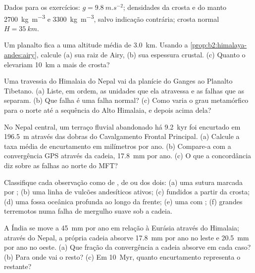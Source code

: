 Dados para os exercícios: $g = \qty{9.8}{m.s^{-2}}$; densidades da crosta e do manto
\qty{2700}{kg.m^{-3}} e \qty{3300}{kg.m^{-3}}, salvo indicação contrária; crosta normal $H =
\qty{35}{km}$.

\begin{exercise}[$\star$]\label{exo:b2:himalaya-andes:1}
Um planalto fica a uma altitude média de \qty{3.0}{km}. Usando a
\cref{prop:b2:himalaya-andes:airy}, calcule (a) sua raiz de Airy, (b) sua espessura crustal.
(c) Quanto o elevariam \qty{10}{km} a mais de crosta?
\end{exercise}

\begin{exercise}[$\star$]\label{exo:b2:himalaya-andes:2}
Uma travessia do Himalaia do Nepal vai da planície do Ganges ao Planalto Tibetano.
(a) Liste, em ordem, as unidades que ela atravessa e as falhas que as separam. (b) Que falha
é uma falha normal? (c) Como varia o grau metamórfico para o norte até a sequência do Alto
Himalaia, e depois acima dela?
\end{exercise}

\begin{exercise}[$\star$]\label{exo:b2:himalaya-andes:3}
No Nepal central, um terraço fluvial abandonado há \qty{9.2}{kyr} foi encurtado em
\qty{196.5}{m} através das dobras do Cavalgamento Frontal Principal. (a) Calcule a taxa média de encurtamento
em milímetros por ano. (b) Compare-a com a convergência GPS através da cadeia,
\qty{17.8}{mm} por ano. (c) O que a concordância diz sobre as falhas ao norte do MFT?
\end{exercise}

\begin{exercise}[$\star$]\label{exo:b2:himalaya-andes:4}
Classifique cada observação como de , de  ou dos dois: (a) uma sutura marcada
por ; (b) uma linha de vulcões andesíticos ativos; (c)  fundidos a partir da
crosta; (d) uma fossa oceânica profunda ao longo da frente; (e) uma  com ;
(f) grandes terremotos numa falha de mergulho suave sob a cadeia.
\end{exercise}

\begin{exercise}[$\star\star$]\label{exo:b2:himalaya-andes:5}
A Índia se move a \qty{45}{mm} por ano em relação à Eurásia através do Himalaia; através do Nepal, a
própria cadeia absorve \qty{17.8}{mm} por ano no leste e \qty{20.5}{mm} por ano no oeste.
(a) Que fração da convergência a cadeia absorve em cada caso? (b) Para onde vai o
resto? (c) Em \qty{10}{Myr}, quanto encurtamento representa o restante?
\end{exercise}

